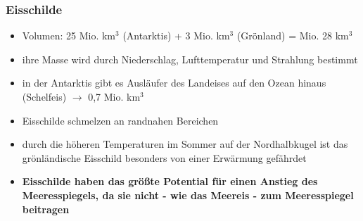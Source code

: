 \begin{frame}
	\frametitle{Eisschilde} %
	\begin{itemize}
		\item Volumen: 25 Mio. km$^3$ (Antarktis) + 3 Mio. km$^3$ (Grönland) = Mio. 28 km$^3$
		\item ihre Masse wird durch Niederschlag, Lufttemperatur und Strahlung bestimmt
		\item in der Antarktis gibt es Ausläufer des Landeises auf den Ozean hinaus (Schelfeis) $\rightarrow$ 0,7 Mio. km$^3$
		\item Eisschilde schmelzen an randnahen Bereichen
		\item durch die höheren Temperaturen im Sommer auf der Nordhalbkugel ist das grönländische Eisschild besonders von einer Erwärmung gefährdet
		\item \textbf{Eisschilde haben das größte Potential für einen Anstieg des Meeresspiegels, da sie nicht - wie das Meereis - zum Meeresspiegel beitragen}
	\end{itemize}

\end{frame}

